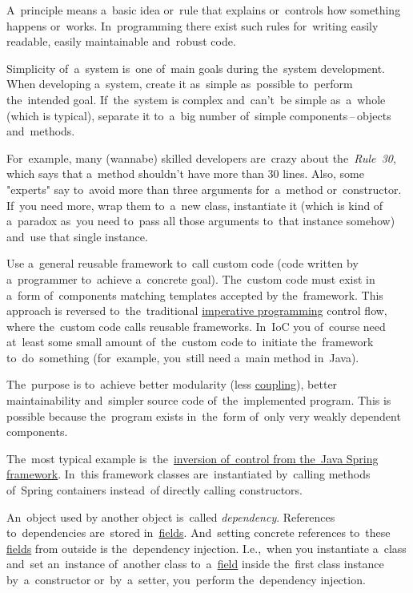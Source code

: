 A~principle means a~basic idea or~rule that explains or~controls how something happens or~works. In~programming there exist such rules for~writing easily readable, easily maintainable and~robust code.

Simplicity of~a~system is~one of~main goals during the~system development. When developing a~system, create it as~simple as~possible to~perform the~intended goal. If~the~system is complex and~can't~be simple as~a~whole (which is typical), separate it to~a~big number of~simple components\,--\,objects and~methods.

For~example, many (wannabe) skilled developers are~crazy about the~\textit{Rule~30}, which says that a~method shouldn't have more than 30 lines. Also, some "experts" say to~avoid more than three arguments for~a~method or~constructor. If~you need more, wrap them to~a~new class, instantiate it (which is kind of a~paradox as~you need to~pass all those arguments to~that instance somehow) and~use that single instance.

\label{inversionofcontrol}
Use a~general reusable framework to~call custom code (code written by a~programmer to~achieve a~concrete goal). The~custom code must exist in a~form of~components matching templates accepted by the~framework. This approach is reversed to~the~traditional \hyperref[imperativeprogramming]{imperative programming} control flow, where the~custom code calls reusable frameworks. In~IoC you of~course need at~least some small amount of~the~custom code to~initiate the~framework to~do~something (for~example, you~still need a~main method in~Java).

The~purpose is to~achieve better modularity (less \hyperref[loosetightcoupling]{coupling}), better maintainability and~simpler source code of~the~implemented program. This is possible because the~program exists in~the~form of~only very weakly dependent components.

The~most typical example is~the~\hyperref[springinversionofcontrol]{inversion of~control from the~Java Spring framework}. In~this framework classes are~instantiated by~calling methods of~Spring containers instead~of directly calling constructors.

\label{dependencyinjection}
An~object used by another object is~called \textit{dependency}. References to~dependencies are~stored in~\hyperref[variablefieldproperty]{fields}. And~setting concrete references to~these \hyperref[variablefieldproperty]{fields} from outside is the~dependency injection. I.e.,~when you instantiate a~class and~set an~instance of~another class to~a~\hyperref[variablefieldproperty]{field} inside the~first class instance by~a~constructor or~by~a~setter, you~perform the~dependency injection.

